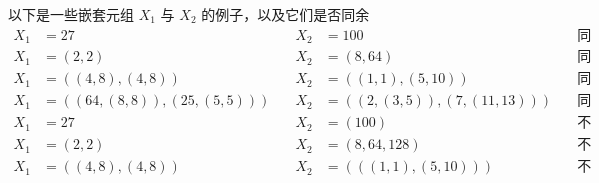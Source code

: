 \begin{example}
    以下是一些嵌套元组 $X_1$ 与 $X_2$ 的例子，以及它们是否同余
\[
\begin{aligned}
X_1 &= 27 \quad & X_2 &= 100 \quad & \text{同余}\\
X_1 &= (2,2) \quad & X_2 &= (8,64) \quad & \text{同余}\\
X_1 &= ((4,8),(4,8)) \quad & X_2 &= ((1,1),(5,10)) \quad & \text{同余}\\
X_1 &= ((64,(8,8)),(25,(5,5))) \quad & X_2 &= ((2,(3,5)),(7,(11,13))) \quad & \text{同余}\\
X_1 &= 27 \quad & X_2 &= (100) \quad & \text{不同余}\\
X_1 &= (2,2) \quad & X_2 &= (8,64,128) \quad & \text{不同余}\\
X_1 &= ((4,8),(4,8)) \quad & X_2 &= (((1,1),(5,10))) \quad & \text{不同余}\\
\end{aligned}
\]
\end{example}








